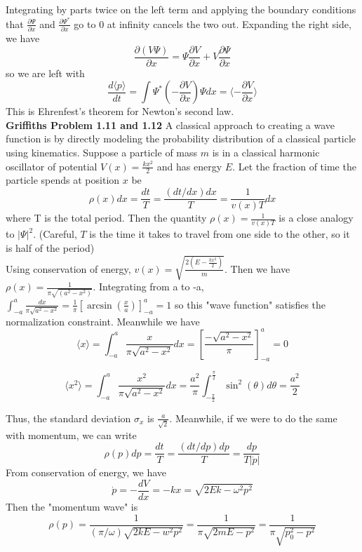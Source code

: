 \documentclass[11pt]{article}
\begin{document}
\noindent Integrating by parts twice on the left term and applying the boundary conditions that \(\frac{\partial\Psi}{\partial x}\) and 
\(\frac{\partial \Psi^*}{\partial x}\) go to 0 at infinity cancels the two out. Expanding the right side, we have
\[
    \frac{\partial (V\Psi)}{\partial x} = \Psi \frac{\partial V}{\partial x} + V \frac{\partial \Psi}{\partial x} 
\]
so we are left with 
\[
    \frac{d\langle p \rangle }{dt} = \int \Psi^* \left(- \frac{\partial V}{\partial x}\right)\Psi dx = \langle -\frac{\partial V}{\partial x}\rangle
\]
\noindent This is Ehrenfest's theorem for Newton's second law. 
\\

\noindent
\textbf{Griffiths Problem 1.11 and 1.12} A classical approach to creating a wave function is by directly modeling the probability distribution
of a classical particle using kinematics. Suppose a particle of mass \(m\) is in a classical harmonic oscillator of potential \(V(x) = \frac{kx^2}{2}\) and
has energy \(E\). Let the fraction of time the particle spends at position \(x\) be 
\[
    \rho(x)dx = \frac{dt}{T} = \frac{(dt/dx)dx}{T} = \frac{1}{v(x)T}dx
\]
where T is the total period. Then the quantity \(\rho(x) = \frac{1}{v(x)T}\) is a close analogy to \(|\Psi|^2\). (Careful, \(T\) is the time it takes to
travel from one side to the other, so it is half of the period)
\\

\noindent Using conservation of energy, \(v(x) = \sqrt{\frac{2(E-\frac{kx^2}{2})}{m}}\). Then we have \(\rho(x) = \frac{1}{\pi\sqrt{(a^2-x^2)}}\). Integrating from
a to -a, \(\int^a_{-a} \frac{dx}{\pi\sqrt{a^2-x^2}} = \frac{1}{\pi}\left[\arcsin(\frac{x}{a})\right]^a_{-a} = 1\) so this "wave function" satisfies the normalization
constraint. Meanwhile we have
\[
    \langle x\rangle = \int^a_{-a}\frac{x}{\pi \sqrt{a^2-x^2}}dx = \left[\frac{-\sqrt{a^2-x^2}}{\pi}\right]^a_{-a} = 0
\]

\[
    \langle x^2\rangle = \int^a_{-a}\frac{x^2}{\pi \sqrt{a^2-x^2}}dx = \frac{a^2}{\pi}\int^{\frac{\pi}{2}}_{-\frac{\pi}{2}} \sin^2{\left(\theta\right)}d\theta = \frac{a^2}{2}
\]

\noindent Thus, the standard deviation \(\sigma_x\) is \(\frac{a}{\sqrt{2}}\). Meanwhile, if we were to do the same with momentum, we can write
\[
    \rho(p)dp = \frac{dt}{T} = \frac{(dt/dp)dp}{T} = \frac{dp}{T|\dot{p}|}
\]
From conservation of energy, we have 
\[
    \dot{p} = -\frac{dV}{dx} = -kx = \sqrt{2Ek-\omega^2p^2}
\]
Then the "momentum wave" is 
\[
    \rho(p) = \frac{1}{(\pi/\omega)\sqrt{2kE - w^2p^2}} = \frac{1}{\pi \sqrt{2mE - p^2}} = \frac{1}{\pi \sqrt{p_0^2 - p^2}}
\]
\end{document}
